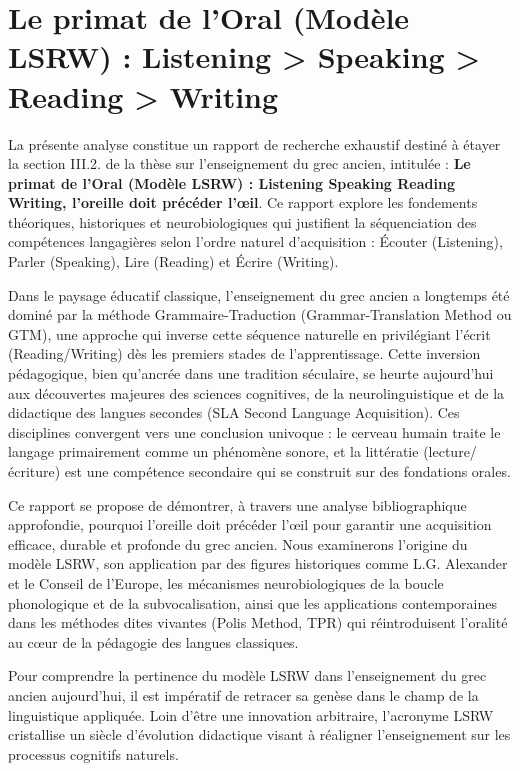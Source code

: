 

\section{Le primat de l'Oral (Modèle LSRW) : Listening > Speaking > Reading > Writing}

La présente analyse constitue un rapport de recherche exhaustif destiné à étayer la section
III.2.\cite{III-2-1-ref1} de la thèse sur l'enseignement du grec ancien, intitulée : \textbf{\og Le
primat de l'Oral (Modèle LSRW) : Listening \> Speaking \> Reading \> Writing, l'oreille doit
précéder l'œil\fg{}}. Ce rapport explore les fondements théoriques, historiques et neurobiologiques
qui justifient la séquenciation des compétences langagières selon l'ordre naturel d'acquisition :
Écouter (Listening), Parler (Speaking), Lire (Reading) et Écrire (Writing).

Dans le paysage éducatif classique, l'enseignement du grec ancien a longtemps été dominé par la
méthode \og Grammaire-Traduction\fg{} (Grammar-Translation Method ou GTM), une approche qui inverse
cette séquence naturelle en privilégiant l'écrit (Reading/Writing) dès les premiers stades de
l'apprentissage.\cite{III-2-1-ref1} Cette inversion pédagogique, bien qu'ancrée dans une tradition
séculaire, se heurte aujourd'hui aux découvertes majeures des sciences cognitives, de la
neurolinguistique et de la didactique des langues secondes (SLA \- Second Language Acquisition). Ces
disciplines convergent vers une conclusion univoque : le cerveau humain traite le langage
primairement comme un phénomène sonore, et la littératie (lecture/écriture) est une compétence
secondaire qui se construit sur des fondations orales.\cite{III-2-1-ref3}

Ce rapport se propose de démontrer, à travers une analyse bibliographique approfondie, pourquoi \og
l'oreille doit précéder l'œil\fg{} pour garantir une acquisition efficace, durable et profonde du
grec ancien. Nous examinerons l'origine du modèle LSRW, son application par des figures historiques
comme L.G. Alexander et le Conseil de l'Europe, les mécanismes neurobiologiques de la boucle
phonologique et de la subvocalisation, ainsi que les applications contemporaines dans les méthodes
dites \og vivantes\fg{} (Polis Method, TPR) qui réintroduisent l'oralité au cœur de la pédagogie des
langues classiques.

Pour comprendre la pertinence du modèle LSRW dans l'enseignement du grec ancien aujourd'hui, il est
impératif de retracer sa genèse dans le champ de la linguistique appliquée. Loin d'être une
innovation arbitraire, l'acronyme LSRW cristallise un siècle d'évolution didactique visant à
réaligner l'enseignement sur les processus cognitifs naturels.



